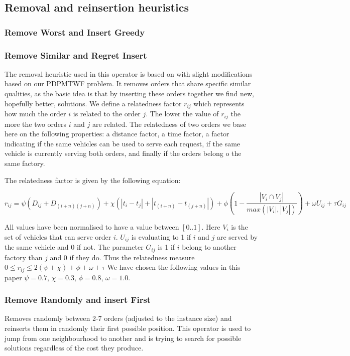 \documentclass[a4paper,10pt]{article}
\begin{document}
\subsection{Removal and reinsertion heuristics}
\subsubsection{Remove Worst and Insert Greedy}
\subsubsection{Remove Similar and Regret Insert}
The removal heuristic used in this operator is based on \citet{shaw97} with slight modifications based on our PDPMTWF problem. 
It removes orders that share specific similar qualities, as the basic idea is that by inserting these orders together we find new, hopefully better, solutions.
We define a relatedness factor $r_{ij}$ which represents how much the order $i$ is related to the order $j$. 
The lower the value of $r_{ij}$ the more the two orders $i$ and $j$ are related.
The relatedness of two orders we base here on the following properties: 
a distance factor, a time factor, a factor indicating if the same vehicles can be used to serve each request, if the same vehicle is currently serving both orders, and finally if the orders belong o the same factory.

The relatedness factor is given by the following equation:

\begin{equation}
\label{relatedness}
    r_{ij} = \psi ( D_{i j} + D_{(i+n)(j+n)}) + \chi ( |t_i - t_j| + |t_{(i+n)} - t_{(j+n)}|) + \phi (1-\dfrac{|V_i\cap V_j|}{max(|V_i|, |V_j|)} ) + \omega U_{ij} + \tau G_{ij}
\end{equation}

All values have been normalised to have a value between $[0..1]$. 
Here $V_i$ is the set of vehicles that can serve order $i$. 
$U_{ij}$ is evaluating to 1 if $i$ and $j$ are served by the same vehicle and 0 if not. 
The parameter $G_{ij}$ is 1 if $i$ belong to another factory than $j$ and 0 if they do. 
Thus the relatedness measure $0\leq r_{ij} \leq 2(\psi + \chi) + \phi + \omega + \tau$
We have chosen the following values in this paper $\psi=0.7$, $\chi = 0.3$, $\phi=0.8$, $\omega=1.0$. 

\subsubsection{Remove Randomly and insert First}
Removes randomly between 2-7 orders (adjusted to the instance size) and reinserts them in randomly their first possible position. 
This operator is used to jump from one neighbourhood to another and is trying to search for possible solutions regardless of the cost they produce.




\end{document}
